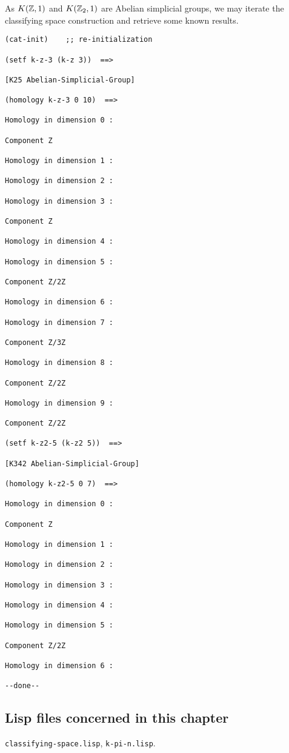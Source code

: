As $K({{\Bbb Z}}, 1)$ and $K({{\Bbb Z}_2}, 1)$ are Abelian simplicial groups, we may iterate the classifying
space construction and retrieve some known results.
{\footnotesize\begin{verbatim}
(cat-init)    ;; re-initialization

(setf k-z-3 (k-z 3))  ==>

[K25 Abelian-Simplicial-Group]

(homology k-z-3 0 10)  ==>

Homology in dimension 0 :

Component Z

Homology in dimension 1 :

Homology in dimension 2 :

Homology in dimension 3 :

Component Z

Homology in dimension 4 :

Homology in dimension 5 :

Component Z/2Z

Homology in dimension 6 :

Homology in dimension 7 :

Component Z/3Z

Homology in dimension 8 :

Component Z/2Z

Homology in dimension 9 :

Component Z/2Z

(setf k-z2-5 (k-z2 5))  ==>

[K342 Abelian-Simplicial-Group]

(homology k-z2-5 0 7)  ==>

Homology in dimension 0 :

Component Z

Homology in dimension 1 :

Homology in dimension 2 :

Homology in dimension 3 :

Homology in dimension 4 :

Homology in dimension 5 :

Component Z/2Z

Homology in dimension 6 :

--done--
\end{verbatim}}

\subsection* {Lisp files concerned in this chapter}

{\tt classifying-space.lisp}, {\tt k-pi-n.lisp}.

